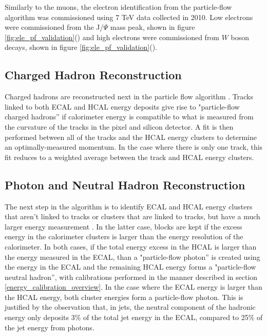 \par Similarly to the muons, the electron identification from the
particle-flow algorithm was commissioned using 7 TeV data collected in
2010.  Low \PT electrons were commissioned from the J/$\Psi$ mass
peak, shown in figure
\ref{fig:ele_pf_validation}() and high \PT
electrons were commissioned from $W$ boson decays, shown in figure
\ref{fig:ele_pf_validation}(). 

\subsection{Charged Hadron Reconstruction}
\label{charged_hadron_reco_overview}

\par Charged hadrons are reconstructed next in the particle flow
algorithm \cite{CMS-PAS-PFT-09-001}.  Tracks linked to both ECAL and
HCAL energy deposits give rise to "particle-flow charged hadrons'' if
calorimeter energy is compatible to what is measured from the curvature of the
tracks in the pixel and silicon detector.  A fit is then performed
between all of the tracks and the HCAL energy clusters to determine an
optimally-measured momentum.  In the case where there is only one
track, this fit reduces to a weighted average between the track and
HCAL energy clusters.  

\subsection{Photon and Neutral Hadron Reconstruction}
\label{neutral_hadron_reco_overview}

\par The next step in the algorithm is to identify ECAL and HCAL
energy clusters that aren't linked to tracks or clusters that are
linked to tracks, but have a much larger energy measurement
.  In the latter case, blocks are kept if the
excess energy in the calorimeter clusters is larger than the energy
resolution of the calorimeter.  In both cases, if the total energy
excess in the HCAL is larger than the energy measured in the ECAL,
than a "particle-flow photon'' is created using the energy in the ECAL
and the remaining HCAL energy forms a "particle-flow neutral hadron'',
with calibrations performed in the manner described in
section \ref{energy_calibration_overview}.  In the case where the ECAL
energy  is larger than the HCAL energy, both cluster energies form a
particle-flow photon.  This is justified by the observation that, in jets,
the neutral component of the hadronic energy only deposits 3$\%$ of
the total jet energy in the ECAL, compared to 25$\%$ of the jet energy
from photons.   


